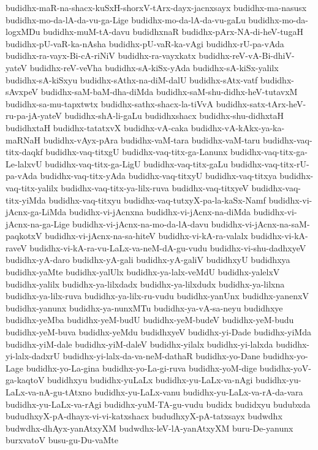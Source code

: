 {budidhx-maR-na-shacx-kuSxH-shorxV-tArx-dayx-jacnxsayx
budidhx-ma-nasusx
budidhx-mo-da-lA-da-vu-ga-Lige
budidhx-mo-da-lA-da-vu-gaLu
budidhx-mo-da-logxMDu
budidhx-muM-tA-davu
budidhxnaR
budidhx-pArx-NA-di-heV-tugaH
budidhx-pU-vaR-ka-nAsha
budidhx-pU-vaR-ka-vAgi
budidhx-rU-pa-vAda
budidhx-ra-vayx-Bi-cA-riNiV
budidhx-ra-vayxkatx
budidhx-reV-vA-Bi-dhiV-yateV
budidhx-reV-veVha
budidhx-sA-kiSx-yAda
budidhx-sA-kiSx-yalilx
budidhx-sA-kiSxyu
budidhx-sAthx-na-diM-dalU
budidhx-sAtx-vatf
budidhx-sAvxpeV
budidhx-saM-baM-dha-diMda
budidhx-saM-shu-didhx-heV-tutavxM
budidhx-sa-mu-tapxtwtx
budidhx-sathx-shacx-la-tiVvA
budidhx-satx-tArx-heV-ru-pa-jA-yateV
budidhx-shA-li-gaLu
budidhxshacx
budidhx-shu-didhxtaH
budidhxtaH
budidhx-tatatxvX
budidhx-vA-caka
budidhx-vA-kAkx-ya-ka-maRNaH
budidhx-vAyx-pAra
budidhx-vaM-tara
budidhx-vaM-taru
budidhx-vaq-titx-daqkf
budidhx-vaq-titxgU
budidhx-vaq-titx-ga-Lanunx
budidhx-vaq-titx-ga-Le-lalxvU
budidhx-vaq-titx-ga-LigU
budidhx-vaq-titx-gaLu
budidhx-vaq-titx-rU-pa-vAda
budidhx-vaq-titx-yAda
budidhx-vaq-titxyU
budidhx-vaq-titxya
budidhx-vaq-titx-yalilx
budidhx-vaq-titx-ya-lilx-ruva
budidhx-vaq-titxyeV
budidhx-vaq-titx-yiMda
budidhx-vaq-titxyu
budidhx-vaq-tutxyX-pa-la-kaSx-Namf
budidhx-vi-jAcnx-ga-LiMda
budidhx-vi-jAcnxna
budidhx-vi-jAcnx-na-diMda
budidhx-vi-jAcnx-na-ga-Lige
budidhx-vi-jAcnx-na-mo-da-lA-davu
budidhx-vi-jAcnx-na-saM-paqkotxV
budidhx-vi-jAcnx-na-sa-hiteV
budidhx-vi-kA-ra-valalx
budidhx-vi-kA-raveV
budidhx-vi-kA-ra-vu-LaLx-va-neM-dA-gu-vudu
budidhx-vi-shu-dadhxyeV
budidhx-yA-daro
budidhx-yA-gali
budidhx-yA-galiV
budidhxyU
budidhxya
budidhx-yaMte
budidhx-yalUlx
budidhx-ya-lalx-veMdU
budidhx-yalelxV
budidhx-yalilx
budidhx-ya-lilxdadx
budidhx-ya-lilxdudx
budidhx-ya-lilxna
budidhx-ya-lilx-ruva
budidhx-ya-lilx-ru-vudu
budidhx-yanUnx
budidhx-yanenxV
budidhx-yanunx
budidhx-ya-nunxMTu
budidhx-ya-vA-sa-neyu
budidhxye
budidhx-yeMba
budidhx-yeM-budU
budidhx-yeM-budeV
budidhx-yeM-budu
budidhx-yeM-buva
budidhx-yeMdu
budidhxyeV
budidhx-yi-Dade
budidhx-yiMda
budidhx-yiM-dale
budidhx-yiM-daleV
budidhx-yilalx
budidhx-yi-lalxda
budidhx-yi-lalx-dadxrU
budidhx-yi-lalx-da-va-neM-dathaR
budidhx-yo-Dane
budidhx-yo-Lage
budidhx-yo-La-gina
budidhx-yo-La-gi-ruva
budidhx-yoM-dige
budidhx-yoV-ga-kaqtoV
budidhxyu
budidhx-yuLaLx
budidhx-yu-LaLx-va-nAgi
budidhx-yu-LaLx-va-nA-gu-tAtxno
budidhx-yu-LaLx-vanu
budidhx-yu-LaLx-va-rA-da-vara
budidhx-yu-LaLx-va-rAgi
budidhx-yuM-TA-gu-vudu
budidx
budidxyu
budubxda
bududhxyX-pA-dhayx-vi-vi-katxshacx
bududhxyX-pA-tatxsayx
budwdhx
budwdhx-dhAyx-yanAtxyXM
budwdhx-leV-lA-yanAtxyXM
buru-De-yanunx
burxvatoV
busu-gu-Du-vaMte
}
